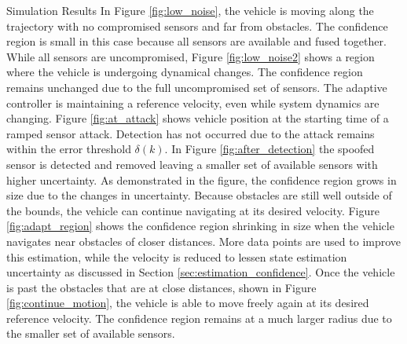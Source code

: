 \begin{section}{Simulation Results}
In Figure \ref{fig:low_noise}, the vehicle is moving along the trajectory with no compromised sensors and far from obstacles. The confidence region is small in this case because all sensors are available and fused together. While all sensors are uncompromised, Figure \ref{fig:low_noise2} shows a region where the vehicle is undergoing dynamical changes. The confidence region remains unchanged due to the full uncompromised set of sensors. The adaptive controller is maintaining a reference velocity, even while system dynamics are changing. Figure \ref{fig:at_attack} shows vehicle position at the starting time of a ramped sensor attack. Detection has not occurred due to the attack remains within the error threshold $\delta(k)$. In Figure \ref{fig:after_detection} the spoofed sensor is detected and removed leaving a smaller set of available sensors with higher uncertainty. As demonstrated in the figure, the confidence region grows in size due to the changes in uncertainty. Because obstacles are still well outside of the bounds, the vehicle can continue navigating at its desired velocity. Figure \ref{fig:adapt_region} shows the confidence region shrinking in size when the vehicle navigates near obstacles of closer distances. More data points are used to improve this estimation, while the velocity is reduced to lessen state estimation uncertainty as discussed in Section \ref{sec:estimation_confidence}. Once the vehicle is past the obstacles that are at close distances, shown in Figure \ref{fig:continue_motion}, the vehicle is able to move freely again at its desired reference velocity. The confidence region remains at a much larger radius due to the smaller set of available sensors.


\begin{figure}[ht]
\begin{tabular}{c}


\end{tabular}
\end{figure}
\end{section}

